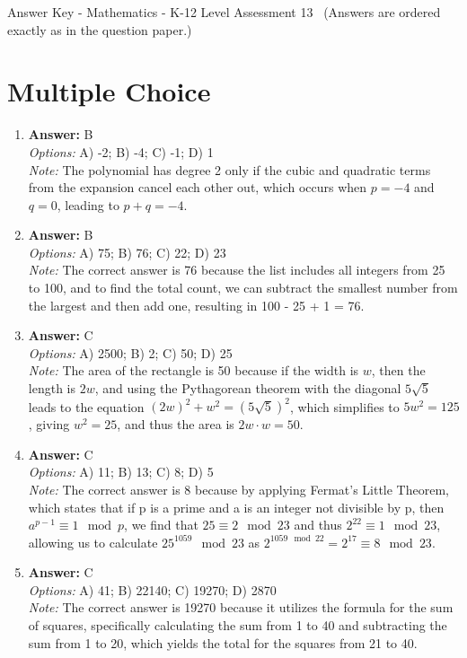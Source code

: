 \documentclass[12pt]{article}
\begin{document}
\begin{center}
Answer Key - Mathematics - K-12 Level Assessment 13 \
\small (Answers are ordered exactly as in the question paper.)
\end{center}

\section*{Multiple Choice}
\begin{enumerate}[label=\arabic*.]
\item \textbf{Answer:} B
\\ \textit{Options:} A) -2; B) -4; C) -1; D) 1
\\ \textit{Note:} The polynomial has degree 2 only if the cubic and quadratic terms from the expansion cancel each other out, which occurs when \( p = -4 \) and \( q = 0 \), leading to \( p + q = -4 \).
\item \textbf{Answer:} B
\\ \textit{Options:} A) 75; B) 76; C) 22; D) 23
\\ \textit{Note:} The correct answer is 76 because the list includes all integers from 25 to 100, and to find the total count, we can subtract the smallest number from the largest and then add one, resulting in 100 - 25 + 1 = 76.
\item \textbf{Answer:} C
\\ \textit{Options:} A) 2500; B) 2; C) 50; D) 25
\\ \textit{Note:} The area of the rectangle is 50 because if the width is $w$, then the length is $2 w$, and using the Pythagorean theorem with the diagonal $5\sqrt{5}$ leads to the equation $(2 w)^2 + w^2 = (5\sqrt{5})^2$, which simplifies to $5 w^2 = 125$, giving $w^2 = 25$, and thus the area is $2 w \cdot w = 50$.
\item \textbf{Answer:} C
\\ \textit{Options:} A) 11; B) 13; C) 8; D) 5
\\ \textit{Note:} The correct answer is 8 because by applying Fermat's Little Theorem, which states that if p is a prime and a is an integer not divisible by p, then \( a^{p-1} \equiv 1 \mod p \), we find that \( 25 \equiv 2 \mod 23 \) and thus \( 2^{22} \equiv 1 \mod 23 \), allowing us to calculate \( 25^{1059} \mod 23 \) as \( 2^{1059 \mod 22} = 2^{17} \equiv 8 \mod 23 \).
\item \textbf{Answer:} C
\\ \textit{Options:} A) 41; B) 22140; C) 19270; D) 2870
\\ \textit{Note:} The correct answer is 19270 because it utilizes the formula for the sum of squares, specifically calculating the sum from 1 to 40 and subtracting the sum from 1 to 20, which yields the total for the squares from 21 to 40.
\end{enumerate}
\end{document}
